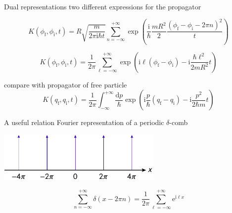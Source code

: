 \documentclass[t,dvipsnames]{beamer}
\begin{document}
\begin{frame}[c]{Dual representations}
 two different expressions for the propagator

 \vspace{0.4truecm}
 \begin{displaymath}
  K(\phi_\text{f}, \phi_\text{i}, t) = R\sqrt{\dfrac{m}{2\pi\text{i}\hbar t}}
      \sum_{n=-\infty}^{+\infty}\exp\left(\dfrac{\text{i}}{\hbar}\dfrac{mR^2}{2}
      \dfrac{(\phi_\text{f}-\phi_\text{i}-2\pi n)^2}{t}\right)
 \end{displaymath}

 \vspace{0.2truecm}
 \begin{displaymath}
  K(\phi_\text{f}, \phi_\text{i}, t) = \frac{1}{2\pi}\sum_{\ell=-\infty}^{+\infty}
	 \exp\left(\text{i}\ell(\phi_\text{f}-\phi_\text{i})
		   -\text{i}\frac{\hbar\ell^2}{2mR^2}t\right)
 \end{displaymath}

 \vspace{0.2truecm}
 compare with propagator of free particle
 \begin{displaymath}
  K(q_\text{f}, q_\text{i}, t)
    = \frac{1}{2\pi}\int_{-\infty}^{+\infty}\frac{\text{d}p}{\hbar}
	  \exp\left(\text{i}\frac{p}{\hbar}(q_\text{f}-q_\text{i})
		    -\text{i}\frac{p^2}{2\hbar m}t\right)
 \end{displaymath}
\end{frame}

\begin{frame}[c]{A useful relation}
 Fourier representation of a periodic $\delta$-comb
 \begin{center}
  \includegraphics[width=0.6\textwidth]{deltacomb}
 \end{center}

 \vspace{0.2truecm}
 \begin{displaymath}
  \sum_{n=-\infty}^{+\infty}\delta(x-2\pi n)
  = \frac{1}{2\pi}\sum_{\ell=-\infty}^{+\infty}\text{e}^{\text{i}\ell x}
 \end{displaymath}

 \vspace{0.4truecm}
 \begin{center}
 \end{center}
\end{frame}
\end{document}
